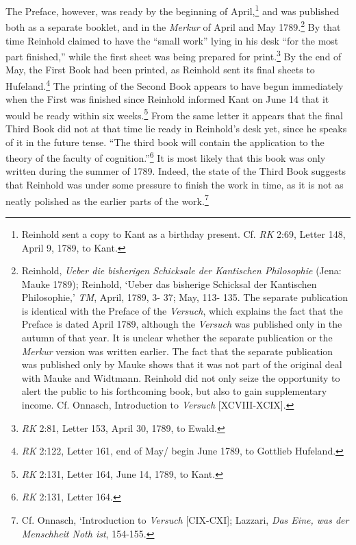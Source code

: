  The Preface, however, was ready by the beginning of April,\footnote{ Reinhold sent a copy to Kant as a birthday present. Cf. \textit{RK} 2:69, Letter 148, April 9, 1789, to Kant. } and was published both as a separate booklet, and in the \textit{Merkur} of April and May 1789.\footnote{\label{footnote:_Ref211316039} Reinhold, \textit{Ueber die bisherigen Schicksale der Kantischen Philosophie} (Jena: Mauke 1789); Reinhold, `Ueber das bisherige Schicksal der Kantischen Philosophie,' \textit{TM}, April, 1789, 3{-} 37; May, 113{-} 135. The separate publication is identical with the Preface of the \textit{Versuch}, which explains the fact that the Preface is dated April 1789, although the \textit{Versuch }was published only in the autumn of that year. It is unclear whether the separate publication or the \textit{Merkur\-} version was written earlier. The fact that the separate publication was published only by Mauke shows that it was not part of the original deal with Mauke and Widtmann. Reinhold did not only seize the opportunity to alert the public to his forthcoming book, but also to gain supplementary income. Cf. Onnasch, Introduction to \textit{Versuch} [XCVIII{-}XCIX].} By that time Reinhold claimed to have the ``small work'' lying in his desk ``for the most part finished,'' while the first sheet was being prepared for print.\footnote{ \textit{RK} 2:81, Letter 153, April 30, 1789, to Ewald. } By the end of May, the First Book had been printed, as Reinhold sent its final sheets to Hufeland.\footnote{ \textit{RK} 2:122, Letter 161, end of May/ begin June 1789, to Gottlieb Hufeland. } The printing of the Second Book appears to have begun immediately when the First was finished since Reinhold informed Kant on June 14 that it would be ready within six weeks.\footnote{ \textit{RK} 2:131, Letter 164, June 14, 1789, to Kant. } From the same letter it appears that the final Third Book did not at that time lie ready in Reinhold's desk yet, since he speaks of it in the future tense. ``The third book will contain the application to the theory of the faculty of cognition.''\footnote{ \textit{RK} 2:131, Letter 164.} It is most likely that this book was only written during the summer of 1789. Indeed, the state of the Third Book suggests that Reinhold was under some pressure to finish the work in time, as it is not as neatly polished as the earlier parts of the work.\footnote{ Cf. Onnasch, `Introduction to \textit{Versuch }[CIX{-}CXI]; Lazzari, \textit{Das Eine, was der Menschheit Noth ist}, 154{-}155. } 

